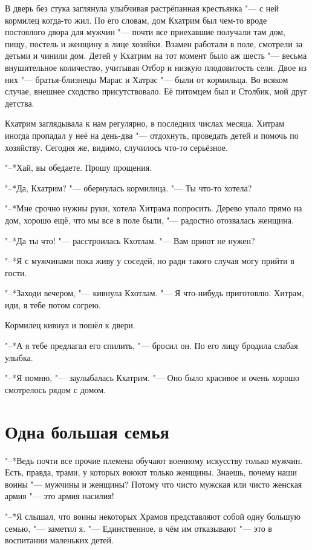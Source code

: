 \documentclass[a4paper,10pt,fleqn]{book}
\begin{document}
В дверь без стука заглянула улыбчивая растрёпанная крестьянка "--- с ней кормилец когда-то жил.
По его словам, дом Кхатрим был чем-то вроде постоялого двора для мужчин "--- почти все приехавшие получали там дом, пищу, постель и женщину в лице хозяйки.
Взамен работали в поле, смотрели за детьми и чинили дом.
Детей у Кхатрим на тот момент было аж шесть "--- весьма внушительное количество, учитывая Отбор и низкую плодовитость сели.
Двое из них "--- братья-близнецы Марас и Хатрас "--- были от кормильца.
Во всяком случае, внешнее сходство присутствовало.
Её питомцем был и Столбик, мой друг детства.

Кхатрим заглядывала к нам регулярно, в последних числах месяца.
Хитрам иногда пропадал у неё на день-два "--- отдохнуть, проведать детей и помочь по хозяйству.
Сегодня же, видимо, случилось что-то серьёзное.

"--*Хай, вы обедаете.
Прошу прощения.

"--*Да, Кхатрим? "--- обернулась кормилица.
"--- Ты что-то хотела?

"--*Мне срочно нужны руки, хотела Хитрама попросить.
Дерево упало прямо на дом, хорошо ещё, что мы все в поле были, "--- радостно отозвалась женщина.

"--*Да ты что! "--- расстроилась Кхотлам.
"--- Вам приют не нужен?

"--*Я с мужчинами пока живу у соседей, но ради такого случая могу прийти в гости.

"--*Заходи вечером, "--- кивнула Кхотлам.
"--- Я что-нибудь приготовлю.
Хитрам, иди, я тебе потом согрею.

Кормилец кивнул и пошёл к двери.

"--*А я тебе предлагал его спилить, "--- бросил он.
По его лицу бродила слабая улыбка.

"--*Я помню, "--- заулыбалась Кхатрим.
"--- Оно было красивое и очень хорошо смотрелось рядом с домом.

\section{Одна большая семья}

"--*Ведь почти все прочие племена обучают военному искусству только мужчин.
Есть, правда, трами, у которых воюют только женщины.
Знаешь, почему наши воины "--- мужчины и женщины?
Потому что чисто мужская или чисто женская армия "--- это армия насилия!

"--*Я слышал, что воины некоторых Храмов представляют собой одну большую семью, "--- заметил я.
"--- Единственное, в чём им отказывают "--- это в воспитании маленьких детей.
\end{document}
